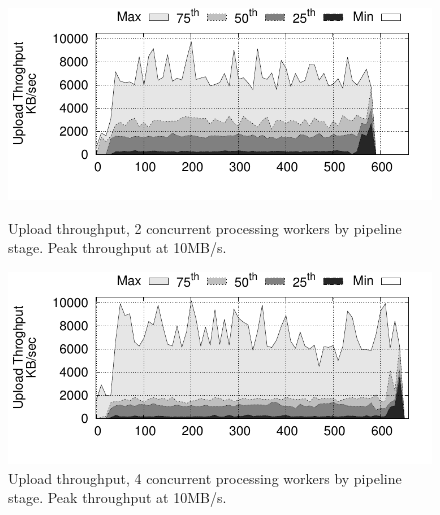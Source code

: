 \begin{figure}[t!]
  \centering
  \includegraphics[scale=0.7]{images/tput_upload_4-datas-2-workers.pdf}
  \caption{Upload throughput, 2 concurrent processing workers by pipeline stage. Peak throughput at 10MB/s.}
  \label{fig:throughput2}
  \vspace{1cm}
  \includegraphics[scale=0.7]{images/tput_upload_4-datas-4-workers.pdf}
  \caption{Upload throughput, 4 concurrent processing workers by pipeline stage. Peak throughput at 10MB/s.}
  \label{fig:throughput4}
\end{figure}

